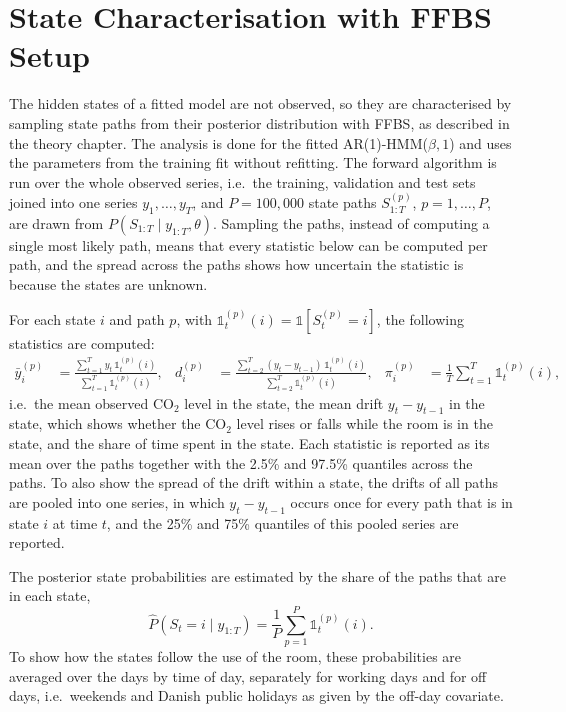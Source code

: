 \section{State Characterisation with FFBS Setup}\label{sec:ffbs-setup}
The hidden states of a fitted model are not observed, so they are characterised
by sampling state paths from their posterior distribution with FFBS, as
described in the theory chapter. The analysis is done for the fitted
AR(1)-HMM($\beta, 1$) and uses the parameters from the training fit without
refitting. The forward algorithm is run over the whole observed series, i.e.\
the training, validation and test sets joined into one series
$y_1, \dots, y_T$, and $P = 100{,}000$ state paths
$S^{(p)}_{1:T}$, $p = 1, \dots, P$, are drawn from
$P(S_{1:T} \mid y_{1:T}, \theta)$. Sampling the paths, instead of computing a
single most likely path, means that every statistic below can be computed per
path, and the spread across the paths shows how uncertain the statistic is
because the states are unknown.

For each state $i$ and path $p$, with $\mathds{1}^{(p)}_t(i) = \mathds{1}[S^{(p)}_t = i]$,
the following statistics are computed:
\begin{align}
    \bar{y}^{(p)}_i &= \frac{\sum_{t=1}^{T} y_t\, \mathds{1}^{(p)}_t(i)}{\sum_{t=1}^{T} \mathds{1}^{(p)}_t(i)},
    &
    d^{(p)}_i &= \frac{\sum_{t=2}^{T} (y_t - y_{t-1})\, \mathds{1}^{(p)}_t(i)}{\sum_{t=2}^{T} \mathds{1}^{(p)}_t(i)},
    &
    \pi^{(p)}_i &= \frac{1}{T} \sum_{t=1}^{T} \mathds{1}^{(p)}_t(i),
\end{align}
i.e.\ the mean observed $\text{CO}_2$ level in the state, the mean drift
$y_t - y_{t-1}$ in the state, which shows whether the $\text{CO}_2$ level
rises or falls while the room is in the state, and the share of time spent in
the state. Each statistic is reported as its mean over the paths together with
the 2.5\% and 97.5\% quantiles across the paths. To also show the spread of
the drift within a state, the drifts of all paths are pooled into one series,
in which $y_t - y_{t-1}$ occurs once for every path that is in state $i$ at
time $t$, and the 25\% and 75\% quantiles of this pooled series are reported.

The posterior state probabilities are estimated by the share of the paths that
are in each state,
\begin{equation}
    \hat{P}(S_t = i \mid y_{1:T}) = \frac{1}{P} \sum_{p=1}^{P} \mathds{1}^{(p)}_t(i).
\end{equation}
To show how the states follow the use of the room, these probabilities are
averaged over the days by time of day, separately for working days and for off
days, i.e.\ weekends and Danish public holidays as given by the off-day
covariate.

